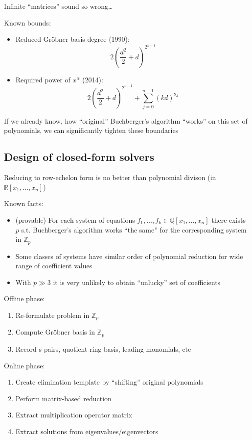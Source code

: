 \begin{frame}
    Infinite ``matrices'' sound so wrong\dots

    Known bounds:
    \begin{itemize}
            \item Reduced Gr\"obner basis degree (1990): $$2\left(\frac{d^2}{2}+d\right)^{2^{n-1}}$$
            \item Required power of $x^\alpha$ (2014): $$2\left(\frac{d^2}{2}+d\right)^{2^{n-1}}+\sum_{j=0}^{n-1}\left(k d\right)^{2j}$$
    \end{itemize}

    If we already know, how ``original'' Buchberger's algorithm ``works'' on this set of polynomials, we can significantly tighten these boundaries
\end{frame}

\subsection{Design of closed-form solvers}
\begin{frame}
    Reducing to row-echelon form is no better than polynomial divison (in $\mathbb{R}\left[x_1,\dots,x_n\right]$)

    Known facts:
    \begin{itemize}
        \item (provable) For each system of equations $f_1,\dots,f_k\in\mathbb{Q}\left[x_1,\dots,x_n\right]$ there exists $p$ s.t. Buchberger's algorithm works ``the same'' for the corresponding system in $\mathbb{Z}_p$
        \item Some classes of systems have similar order of polynomial reduction for wide range of coefficient values
        \item With $p\gg 3$ it is very unlikely to obtain ``unlucky'' set of coefficients
    \end{itemize}
\end{frame}

\begin{frame}
    Offline phase:
    \begin{enumerate}
        \item Re-formulate problem in $\mathbb{Z}_p$
        \item Compute Gr\"obner basis in $\mathbb{Z}_p$
        \item Record s-pairs, quotient ring basis, leading monomials, etc
    \end{enumerate}

    Online phase:
    \begin{enumerate}
        \item Create elimination template by ``shifting'' original polynomials
        \item Perform matrix-based reduction
        \item Extract multiplication operator matrix
        \item Extract solutions from eigenvalues/eigenvectors
    \end{enumerate}
\end{frame}

